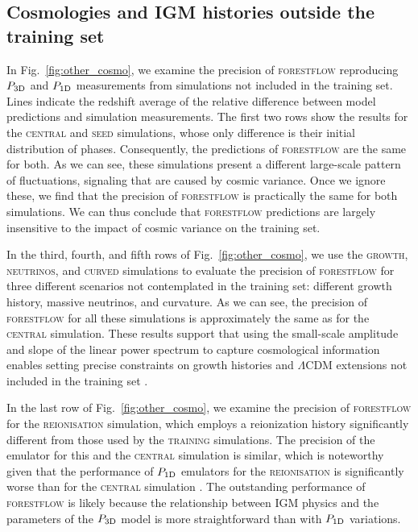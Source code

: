 \documentclass{aa}
\newcommand{\poned}{\ensuremath{P_{\rm 1D}}\xspace}
\newcommand{\pthreed}{\ensuremath{P_{\rm 3D}}\xspace}
\newcommand{\forestflow}{\textsc{forestflow}\xspace}
\newcommand{\lacehc}{\textsc{training}\xspace}
\newcommand{\simseed}{\textsc{seed}\xspace}
\newcommand{\simigm}{\textsc{reionisation}\xspace}
\newcommand{\simcurved}{\textsc{curved}\xspace}
\newcommand{\simh}{\textsc{growth}\xspace}
\newcommand{\simnu}{\textsc{neutrinos}\xspace}
\newcommand{\simcentral}{\textsc{central}\xspace}
\begin{document}
\subsection{Cosmologies and IGM histories outside the training set}
\label{sec:results_other}

In Fig.~\ref{fig:other_cosmo}, we examine the precision of \forestflow reproducing \pthreed and \poned measurements from simulations not included in the training set. Lines indicate the redshift average of the relative difference between model predictions and simulation measurements. The first two rows show the results for the \simcentral and \simseed simulations, whose only difference is their initial distribution of phases. Consequently, the predictions of \forestflow are the same for both. As we can see, these simulations present a different large-scale pattern of fluctuations, signaling that are caused by cosmic variance. Once we ignore these, we find that the precision of \forestflow is practically the same for both simulations. We can thus conclude that \forestflow predictions are largely insensitive to the impact of cosmic variance on the training set.

In the third, fourth, and fifth rows of Fig.~\ref{fig:other_cosmo}, we use the \simh, \simnu, and \simcurved simulations to evaluate the precision of \forestflow for three different scenarios not contemplated in the training set: different growth history, massive neutrinos, and curvature. As we can see, the precision of \forestflow for all these simulations is approximately the same as for the \simcentral simulation. These results support that using the small-scale amplitude and slope of the linear power spectrum to capture cosmological information enables setting precise constraints on growth histories and $\Lambda$CDM extensions not included in the training set \citep[see also][]{Pedersen2021, pedersen2023CompressingCosmologicalInformation, cabayol-garcia2023NeuralNetworkEmulator}.

In the last row of Fig.~\ref{fig:other_cosmo}, we examine the precision of \forestflow for the \simigm simulation, which employs a  reionization history significantly different from those used by the \lacehc simulations. The precision of the emulator for this and the \simcentral simulation is similar, which is noteworthy given that the performance of \poned emulators for the \simigm is significantly worse than for the \simcentral simulation \citep{cabayol-garcia2023NeuralNetworkEmulator}. The outstanding performance of \forestflow is likely because the relationship between IGM physics and the parameters of the \pthreed model is more straightforward than with \poned variations.
\end{document}
